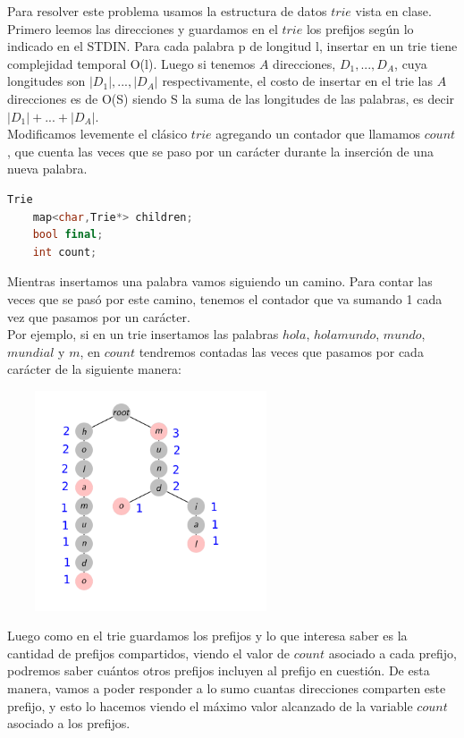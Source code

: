 \documentclass[a4paper]{article}
\begin{document}
Para resolver este problema usamos la estructura de datos $trie$ vista en clase.
Primero leemos las direcciones y guardamos en el $trie$ los prefijos según lo indicado en el STDIN.
Para cada palabra p de longitud l, insertar en un trie tiene complejidad temporal O(l). Luego si tenemos $A$ direcciones, $D_{1},...,D_{A}$, cuya longitudes son $|D_{1}|,...,|D_{A}|$ respectivamente, el costo de insertar en el trie las $A$ direcciones es de O(S) siendo S la suma de las longitudes de las palabras, es decir $|D_{1}|+...+|D_{A}|$.\\

Modificamos levemente el clásico $trie$ agregando un contador que llamamos $count$, que cuenta las veces que se paso por un carácter durante la inserción de una nueva palabra.

\begin{lstlisting}[language=c++]
Trie
	map<char,Trie*> children;
	bool final;	
	int count;
\end{lstlisting}

Mientras insertamos una palabra vamos siguiendo un camino. Para contar las veces que se pasó por este camino, tenemos el contador que va sumando 1 cada vez que pasamos por un carácter.\\

Por ejemplo, si en un trie insertamos las palabras $hola$, $holamundo$, $mundo$, $mundial$ y $m$, en $count$ tendremos contadas las veces que pasamos por cada carácter de la siguiente manera:

\begin{center}
\includegraphics[width=8.5cm,height=6.5cm,keepaspectratio]{trieEjemplo.png}
\end{center}

Luego como en el trie guardamos los prefijos y lo que interesa saber es la cantidad de prefijos compartidos, viendo el valor de $count$ asociado a cada prefijo, podremos saber cuántos otros prefijos incluyen al prefijo en cuestión. De esta manera, vamos a poder responder a lo sumo cuantas direcciones comparten este prefijo, y esto lo hacemos viendo el máximo valor alcanzado de la variable $count$ asociado a los prefijos.\\
\end{document}
